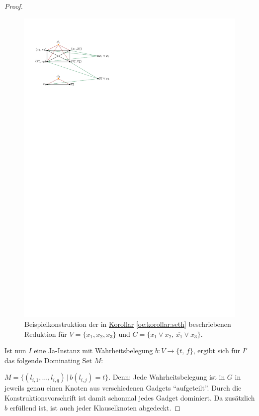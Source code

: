 \documentclass[a4paper,ngerman]{atseminar}
\begin{document}
\begin{proof}
  \begin{figure}[h]
    \centering
    \includegraphics[scale = 1.2]{./images/reduction.pdf}
    \caption{Beispielkonstruktion der in \hyperref[oe:korollar:seth]{Korollar} \ref{oe:korollar:seth} beschriebenen Reduktion für $V = \{x_1, x_2, x_3\} $ und $ C = \{x_1 \lor x_2,\, \overline{x_1} \lor x_3\}$.}
    \label{OE:fig:reduction}
  \end{figure}

  \noindent
  Ist nun $I$ eine Ja-Instanz mit Wahrheitsbelegung $b: V \rightarrow \{t,\, f\}$, ergibt sich für $I'$ das folgende Dominating Set $M$:

  \noindent
  $M = \{(l_{i,1}, \dots, l_{i,q}) \,|\, b(l_{i,j}) = t\}$.
  Denn: Jede Wahrheitsbelegung ist in $G$ in jeweils genau einen Knoten aus verschiedenen Gadgets \enquote{aufgeteilt}. Durch die Konstruktionsvorschrift
  ist damit schonmal jedes Gadget dominiert. Da zusätzlich $b$ erfüllend ist, ist auch jeder Klauselknoten abgedeckt.


\end{proof}
\end{document}
